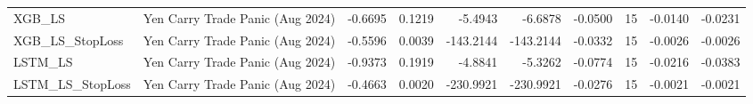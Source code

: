 \begin{tabular}{llrrrrrrrr}
\cline{1-10}
XGB\_LS & Yen Carry Trade Panic (Aug 2024) & -0.6695 & 0.1219 & -5.4943 & -6.6878 & -0.0500 & 15 & -0.0140 & -0.0231 \\
\cline{1-10}
XGB\_LS\_StopLoss & Yen Carry Trade Panic (Aug 2024) & -0.5596 & 0.0039 & -143.2144 & -143.2144 & -0.0332 & 15 & -0.0026 & -0.0026 \\
\cline{1-10}
LSTM\_LS & Yen Carry Trade Panic (Aug 2024) & -0.9373 & 0.1919 & -4.8841 & -5.3262 & -0.0774 & 15 & -0.0216 & -0.0383 \\
\cline{1-10}
LSTM\_LS\_StopLoss & Yen Carry Trade Panic (Aug 2024) & -0.4663 & 0.0020 & -230.9921 & -230.9921 & -0.0276 & 15 & -0.0021 & -0.0021 \\
\cline{1-10}
\bottomrule
\end{tabular}
